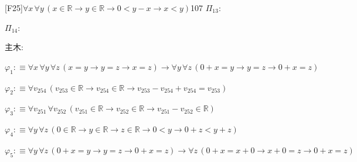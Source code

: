 \begin{fullproof}{[F25]}{$\forall x\,\forall y\,(x \in \mathbb{R} \to y \in \mathbb{R} \to 0 < y - x \to x < y)$}{107}
\noindent$\Pi_{13}$:
\begin{ptree}
\noLine
{}
\end{ptree}
\noindent$\Pi_{14}$:
\begin{ptree}
\noLine
{}
\noLine
{}
\end{ptree}
\noindent 主木:
\begin{ptree}
\noLine
{}
\end{ptree}
\begin{abbrevlist}
\item $\varphi_{1} :\equiv \forall x\,\forall y\,\forall z\,(x = y \to y = z \to x = z) \to \forall y\,\forall z\,(0 + x = y \to y = z \to 0 + x = z)$
\item $\varphi_{2} :\equiv \forall v_{254}\,(v_{253} \in \mathbb{R} \to v_{254} \in \mathbb{R} \to v_{253} - v_{254} + v_{254} = v_{253})$
\item $\varphi_{3} :\equiv \forall v_{251}\,\forall v_{252}\,(v_{251} \in \mathbb{R} \to v_{252} \in \mathbb{R} \to v_{251} - v_{252} \in \mathbb{R})$
\item $\varphi_{4} :\equiv \forall y\,\forall z\,(0 \in \mathbb{R} \to y \in \mathbb{R} \to z \in \mathbb{R} \to 0 < y \to 0 + z < y + z)$
\item $\varphi_{5} :\equiv \forall y\,\forall z\,(0 + x = y \to y = z \to 0 + x = z) \to \forall z\,(0 + x = x + 0 \to x + 0 = z \to 0 + x = z)$

\end{abbrevlist}
\end{fullproof}
